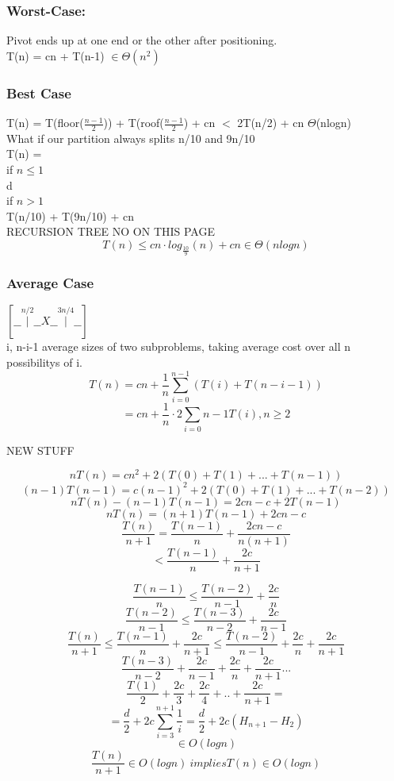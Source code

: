 \documentclass[12pt]{article}
\begin{document}
	\subsubsection*{Worst-Case:}
	Pivot ends up at one end or the other after positioning.\\
	T(n) = cn + T(n-1) $\in \Theta(n^2)$\\
	
	\subsubsection*{Best Case}
	T(n) = T(floor($\frac{n-1}{2}$)) + T(roof($\frac{n-1}{2}$) + cn $<$ 2T(n/2) + cn $\Theta$(nlogn)\\
	
	What if our partition always splits n/10 and 9n/10\\
	T(n) = \\
	if $n \leq 1$\\
	d\\
	if $n > 1$\\
	T(n/10) + T(9n/10) + cn\\
	
	RECURSION TREE NO ON THIS PAGE\\
	
	$$T(n) \leq cn \cdot log_{\frac{10}{9}}(n) + cn \in \Theta(nlogn)$$
	
	\subsubsection*{Average Case}
	$[\_\_\overset{n/2}{|}\_\_X\_\_\overset{3n/4}{|}\_\_]$\\
	
	i, n-i-1 average sizes of two subproblems, taking average cost over all n possibilitys of i.\\
	
	$$T(n) = cn + \frac{1}{n}\sum_{i=0}^{n-1}(T(i) + T(n-i-1))$$
	$$ = cn + \frac{1}{n} \cdot 2 \sum_{i=0}{n-1}T(i), n \geq 2$$
	
	NEW STUFF
	
	$$nT(n) = cn^2 + 2(T(0) + T(1) + ... + T(n-1))$$
	$$(n-1)T(n-1) = c(n-1)^2 + 2(T(0) + T(1) + ... + T(n-2))$$
	$$nT(n) - (n-1)T(n-1) = 2cn - c + 2T(n-1)$$
	$$nT(n) = (n+1)T(n-1) + 2cn - c$$
	$$\frac{T(n)}{n+1} = \frac{T(n-1)}{n} + \frac{2cn - c}{n(n+1)}$$
	$$ < \frac{T(n-1)}{n} + \frac{2c}{n+1}$$
	
	$$\frac{T(n-1)}{n} \leq \frac{T(n-2)}{n-1} + \frac{2c}{n}$$
	$$\frac{T(n-2)}{n-1} \leq \frac{T(n-3)}{n-2} + \frac{2c}{n-1}$$
	$$\frac{T(n)}{n+1} \leq \frac{T(n-1)}{n} + \frac{2c}{n+1} \leq \frac{T(n-2)}{n-1} + \frac{2c}{n} + \frac{2c}{n+1}$$
	$$\frac{T(n-3)}{n-2} + \frac{2c}{n-1} + \frac{2c}{n} + \frac{2c}{n + 1} ...$$
	$$\frac{T(1)}{2} + \frac{2c}{3} + \frac{2c}{4} + .. + \frac{2c}{n+1} = $$
	$$= \frac{d}{2} + 2c\sum_{i=3}^{n+1}\frac{1}{i} = \frac{d}{2} + 2c(H_{n+1} - H_{2})$$
	$$\in O(logn)$$
	$$\frac{T(n)}{n+1} \in O(logn) \ implies T(n) \in O(logn)$$
	
\end{document}
